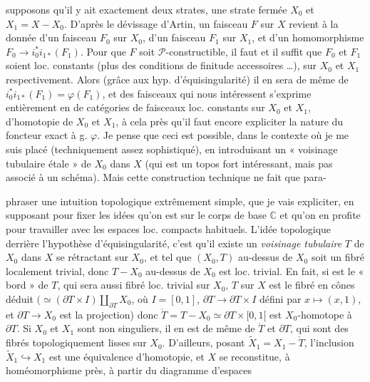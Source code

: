 \documentclass[11pt,a4paper]{article}
\begin{document}
supposons qu'il y ait exactement deux strates, une strate fermée $X_0$ et $X_1 = X - X_0$. D'après le dévissage d'Artin, un faisceau $F$ sur $X$ revient à la donnée d'un faisceau $F_0$  sur $X_0$, d'un faisceau $F_1$  sur $X_1$, et d'un homomorphisme $F_0 \to i_0^* i_{1*}(F_1)$. Pour que $F$  soit $\mathcal{P}$-constructible, il faut et il suffit que $F_0$ et $F_1$ soient loc. constants (plus des conditions de finitude accessoires …), sur $X_0$ et $X_1$ respectivement. Alors (grâce aux hyp. d'équisingularité) il en sera de même de $i_0^* i_{1*}(F_1) = \varphi(F_1)$, et  des faisceaux qui nous intéressent \struck{\ill{}} s'exprime entièrement en   de catégories de faisceaux loc. constants sur $X_0$ et $X_1$,  \struck{\ill{}}  d'homotopie de $X_0$ et $X_1$, à cela près qu'il faut encore expliciter la nature du foncteur exact à g. $\varphi$. Je pense que ceci est possible, dans le contexte  où je me suis placé (techniquement assez sophistiqué), en introduisant un « voisinage tubulaire étale » de $X_0$ dans $X$ (qui est un topos fort intéressant, mais pas associé à un schéma). Mais cette construction technique ne fait que para-

phraser une intuition topologique extrêmement simple, que je vais expliciter, en supposant pour fixer les idées qu'on est sur le corps de base $\mathbb{C}$ et qu'on en profite pour travailler avec les espaces loc. compacts habituels. L'idée topologique derrière l'hypothèse d'équisingularité, c'est qu'il existe un \emph{voisinage tubulaire} $T$ de $X_0$ dans $X$ se rétractant sur $X_0$, et tel que $(X_0, T)$ au-dessus de $X_0$ soit un fibré localement trivial, donc $T - X_0$ au-dessus de $X_0$ est loc. trivial. En fait, si  \struck{\ill{}} est le « bord » de $T$, qui sera aussi fibré loc. trivial sur $X_0$, $T$ sur $X$ est le fibré en cônes déduit $(\simeq (\partial T \times I) \amalg_{\partial T} X_0$, où $I = [0, 1]$, $\partial T \to \partial T \times I$ défini par $x \mapsto (x, 1)$, et $\partial T \to X_0$ est la projection) donc $\mathring{T} = T - X_0 \simeq \partial T \times [0, 1[$ est $X_0$-homotope à $\partial T$. Si $X_0$ et $X_1$ sont non singuliers, il en est de même de $\mathring{T}$ et $\partial T$, qui sont des fibrés topologiquement lisses sur $X_0$. D'ailleurs, \struck{\ill{}} posant $\tilde{X}_1 = X_1 - \mathring{T}$, \struck{\ill{}} l'inclusion $\tilde{X}_1 \hookrightarrow X_1$ est une équivalence d'homotopie, et $X$ se reconstitue, à homéomorphisme près, à partir du diagramme d'espaces
\end{document}
